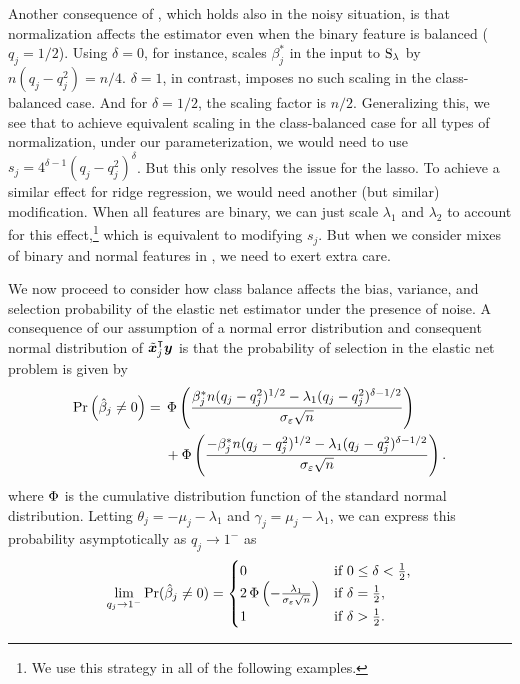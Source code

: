 Another consequence of , which holds also in the noisy
situation, is that normalization affects the estimator even when the binary feature is
balanced (\(q_j = 1/2\)). Using \(\delta = 0\), for instance, scales \(\beta_j^*\) in the
input to \(\operatorname{S}_\lambda\) by \(n (q_j - q_j^2) = n/4\). \(\delta = 1\), in contrast, imposes
no such scaling in the class-balanced case. And for \(\delta = 1/2\), the scaling factor is
\(n/2\). Generalizing this, we see that to achieve equivalent scaling in the class-balanced
case for all types of normalization, under our parameterization, we would need to use \(s_j
= 4^{\delta - 1} (q_j - q_j^2)^\delta\). But this only resolves the issue for the lasso. To
achieve a similar effect for ridge regression, we would need another (but similar)
modification. When all features are binary, we can just scale \(\lambda_1\) and
\(\lambda_2\) to account for this effect,\footnote{We use this strategy in all of the
  following examples.} which is equivalent to modifying \(s_j\). But when we consider mixes
of binary and normal features in , we need to exert extra care.

We now proceed to consider how class balance affects the bias, variance, and selection
probability of the elastic net estimator under the presence of noise. A consequence of our
assumption of a normal error distribution and consequent normal distribution of
\(\tilde{\bm{x}}_j^\intercal \bm{y}\) is that the probability of selection in the elastic net
problem is given by
\begin{align}
  \label{eq:selection-probability}
  \Pr\left(\hat{\beta}_j \neq 0\right)  ={} & \operatorname{\Phi} \left( \frac{\beta_j^*n (q_j-q_j^2)^{1/2} - \lambda_1(q_j-q_j^2)^{\delta - 1/2}}{\sigma_\varepsilon \sqrt{n}}\right)\nonumber \\
                                            & + \operatorname{\Phi} \left( \frac{-\beta_j^*n (q_j-q_j^2)^{1/2} - \lambda_1(q_j-q_j^2)^{\delta - 1/2}}{\sigma_\varepsilon \sqrt{n}}\right).
\end{align}
where \(\operatorname{\Phi}\) is the cumulative distribution function of the standard normal distribution.
Letting \(\theta_j = -\mu_j - \lambda_1 \) and \(\gamma_j = \mu_j - \lambda_1\), we can
express this probability asymptotically as \(q_j \rightarrow 1^-\) as
\begin{equation}
  \label{eq:selection-probability-limit}
  \lim_{q_j \rightarrow 1^-} \Pr(\hat{\beta}_j \neq 0) =
  \begin{cases}
    0                                                                & \text{if } 0 \leq \delta < \frac{1}{2}, \\
    2\operatorname{\Phi}\left(-\frac{\lambda_1}{\sigma_\varepsilon \sqrt{n}}\right) & \text{if } \delta = \frac{1}{2},        \\
    1                                                                & \text{if } \delta > \frac{1}{2}.
  \end{cases}
\end{equation}

